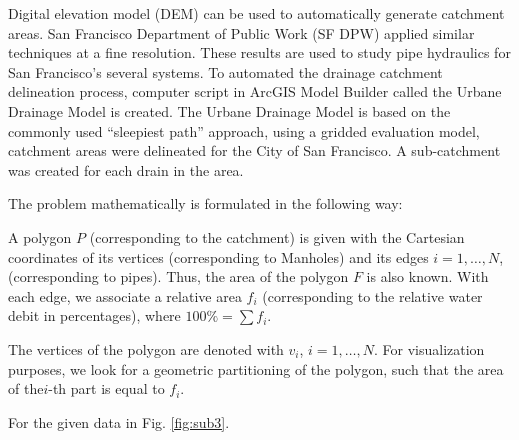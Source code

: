 \documentclass[11pt,leqno]{book}
\begin{document}
Digital elevation model (DEM) can be used to automatically generate catchment areas. San Francisco Department of Public Work (SF DPW) applied similar techniques at a fine resolution.  These results are used to study pipe hydraulics for San Francisco’s several systems. To automated the drainage catchment delineation process,  computer script in ArcGIS Model Builder called the Urbane Drainage Model is created. The Urbane Drainage Model is based on the commonly used “sleepiest path” approach,  using a gridded evaluation model, catchment areas were delineated for the City of San Francisco. A sub-catchment was created for each drain in the area.

The problem  mathematically is formulated in the following way:

A polygon $P$ (corresponding to the catchment) is given with the Cartesian coordinates of its vertices (corresponding to Manholes) and its edges $i= 1, \ldots, N$, (corresponding to pipes). Thus, the area of the polygon $F$ is also known. With each edge, we associate a relative area $f_i$ (corresponding to the relative water debit in percentages), where  $100\% = \sum f_i$.

The vertices of the polygon are denoted with $v_i$, $ i = 1, \ldots, N$.
For visualization purposes, we look for a geometric partitioning of the polygon, such that the area of the$i$-th part is equal to $f_i$.

For the given data in Fig. \ref{fig:sub3}.
\end{document}
